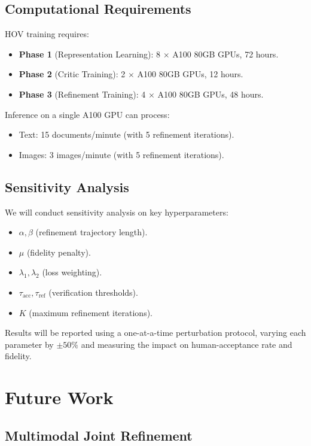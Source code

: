 \documentclass[12pt,oneside]{article}
\begin{document}
{{{{{{{{{{{\subsection{Computational Requirements}

HOV training requires:
\begin{itemize}[noitemsep]
    \item \textbf{Phase 1} (Representation Learning): 8 $\times$ A100 80GB GPUs, 72 hours.
    \item \textbf{Phase 2} (Critic Training): 2 $\times$ A100 80GB GPUs, 12 hours.
    \item \textbf{Phase 3} (Refinement Training): 4 $\times$ A100 80GB GPUs, 48 hours.
\end{itemize}

Inference on a single A100 GPU can process:
\begin{itemize}[noitemsep]
    \item Text: 15 documents/minute (with 5 refinement iterations).
    \item Images: 3 images/minute (with 5 refinement iterations).
\end{itemize}

\subsection{Sensitivity Analysis}

We will conduct sensitivity analysis on key hyperparameters:
\begin{itemize}[noitemsep]
    \item $\alpha, \beta$ (refinement trajectory length).
    \item $\mu$ (fidelity penalty).
    \item $\lambda_1, \lambda_2$ (loss weighting).
    \item $\tau_\text{acc}, \tau_\text{ref}$ (verification thresholds).
    \item $K$ (maximum refinement iterations).
\end{itemize}

Results will be reported using a one-at-a-time perturbation protocol, varying each parameter by $\pm 50\%$ and measuring the impact on human-acceptance rate and fidelity.

\section{Future Work}

\subsection{Multimodal Joint Refinement}

}}}}}}}}}}}
\end{document}

